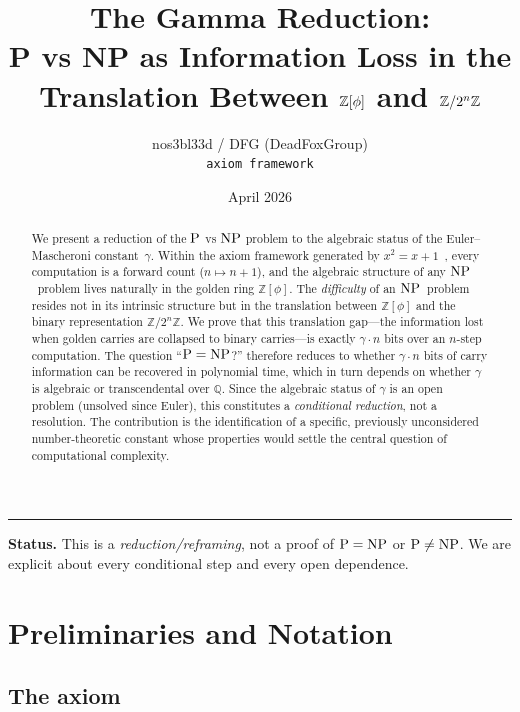 \documentclass[12pt, a4paper]{article}
\title{%
  \textbf{The Gamma Reduction:}\\[4pt]
  \large P vs NP as Information Loss in the\\
  Translation Between $\Z[\phi]$ and $\Z/2^n\Z$%
}
\author{%
  nos3bl33d / DFG (DeadFoxGroup)\\
  \texttt{axiom framework}
}
\date{April 2026}
\theoremstyle{plain}
\theoremstyle{definition}
\theoremstyle{remark}
\newcommand{\Z}{\mathbb{Z}}
\newcommand{\Q}{\mathbb{Q}}
\newcommand{\NP}{\textup{NP}}
\newcommand{\PP}{\textup{P}}
\newcommand{\Zphi}{\Z[\phi]}
\begin{document}
\maketitle

\begin{abstract}
We present a reduction of the $\PP$ vs $\NP$ problem to the algebraic
status of the Euler--Mascheroni constant~$\gamma$.  Within the axiom
framework generated by $x^2 = x + 1$~\cite{nos3bl33d-axiom}, every computation is a forward
count ($n \mapsto n+1$), and the algebraic structure of any
$\NP$~problem lives naturally in the golden ring $\Zphi$.  The
\emph{difficulty} of an $\NP$~problem resides not in its intrinsic
structure but in the translation between $\Zphi$ and the binary
representation $\Z/2^n\Z$.  We prove that this translation gap---the
information lost when golden carries are collapsed to binary
carries---is exactly $\gamma \cdot n$ bits over an $n$-step
computation.  The question ``$\PP = \NP$?'' therefore reduces to
whether $\gamma \cdot n$ bits of carry information can be recovered in
polynomial time, which in turn depends on whether $\gamma$ is
algebraic or transcendental over $\Q$.  Since the algebraic status of
$\gamma$ is an open problem (unsolved since Euler), this constitutes a
\emph{conditional reduction}, not a resolution.  The contribution is
the identification of a specific, previously unconsidered
number-theoretic constant whose properties would settle the central
question of computational complexity.
\end{abstract}

\bigskip
\hrule
\bigskip

\noindent\textbf{Status.}  This is a \emph{reduction/reframing}, not
a proof of $\PP = \NP$ or $\PP \neq \NP$.  We are explicit about
every conditional step and every open dependence.

\tableofcontents

\newpage

\section{Preliminaries and Notation}

\subsection{The axiom}
\end{document}
